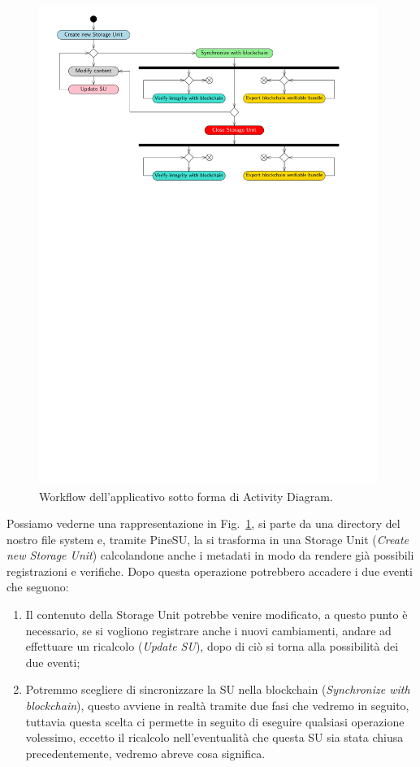 \begin{figure}[H]
    \centering
    \includegraphics[width=0.98\textwidth]{Figures/activityDiag}
    \caption{\small{
    Workflow dell'applicativo sotto forma di Activity Diagram.
    } %
    } %
    \label{fi:workflow}
\end{figure}

Possiamo vederne una rappresentazione in Fig.~\ref{fi:workflow}, si parte da una directory del nostro file
system e, tramite PineSU, la si trasforma in una Storage Unit (\emph{Create new Storage Unit}) calcolandone
anche i metadati in modo da rendere già possibili registrazioni e verifiche.
Dopo questa operazione potrebbero accadere i due eventi che seguono: 
\begin{enumerate}
    \item Il contenuto della Storage Unit potrebbe venire modificato,
    a questo punto è necessario, se si vogliono registrare anche i nuovi cambiamenti,
    andare ad effettuare un ricalcolo (\emph{Update SU}), dopo di ciò
    si torna alla possibilità dei due eventi;
    \item Potremmo scegliere di sincronizzare la SU nella blockchain (\emph{Synchronize with blockchain}),
    questo avviene in realtà tramite due fasi che vedremo in seguito, tuttavia
    questa scelta ci permette in seguito di eseguire qualsiasi operazione volessimo,
    eccetto il ricalcolo nell'eventualità che questa SU sia stata chiusa precedentemente,
    vedremo abreve cosa significa.
\end{enumerate}
 

